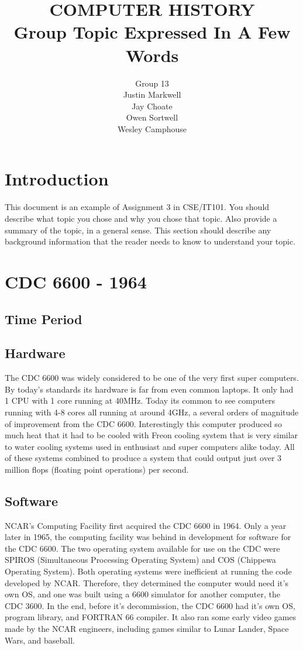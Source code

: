 \documentclass[letterpaper, 10 pt, conference]{IEEEconf}
\title{\LARGE \bf
COMPUTER HISTORY\\
\large Group Topic Expressed In A Few Words
}
\author{Group 13\\
\small Justin Markwell\\
\small Jay Choate\\
\small Owen Sortwell\\
\small Wesley Camphouse\\
}
\begin{document}
\maketitle
\thispagestyle{empty}
\pagestyle{empty}


\section{Introduction}

This document is an example of Assignment 3 in CSE/IT101.
You should describe what topic you chose and
why you chose that topic. Also provide a summary of the
topic, in a general sense. This section should describe any
background information that the reader needs to know to
understand your topic.

\section{CDC 6600 - 1964}
\subsection{Time Period}
\subsection{Hardware}
The CDC 6600 was widely considered to be one of the very first super computers. By today's standards its hardware is far from even common laptops. It only had 1 CPU with 1 core running at 40MHz. Today its common to see computers running with 4-8 cores all running at around 4GHz, a several orders of magnitude of improvement from the CDC 6600. Interestingly this computer produced so much heat that it had to be cooled with Freon cooling system that is very similar to water cooling systems used in enthusiast and super computers alike today. All of these systems combined to produce a system that could output just over 3 million flops (floating point operations) per second.   
\subsection{Software}
NCAR's Computing Facility first acquired the CDC 6600 in 1964. 
Only a year later in 1965, the computing facility was behind in 
development for software for the CDC 6600. The two operating 
system available for use on the CDC were SPIROS (Simultaneous
Processing Operating System) and COS (Chippewa Operating System). 
Both operating systems were inefficient at running the code 
developed by NCAR. Therefore, they determined the computer would 
need it's own OS, and one was built using a 6600 simulator for 
another computer, the CDC 3600. In the end, before it's 
decommission, the CDC 6600 had it's own OS, program library, and 
FORTRAN 66 compiler. It also ran some early video games made by 
the NCAR engineers, including games similar to Lunar Lander, Space
Wars, and baseball.
\end{document}
